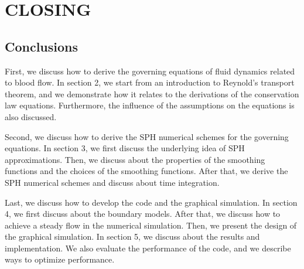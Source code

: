 \chapter{CLOSING}
\thispagestyle{fancy}

	\section{Conclusions}
	    \iffalse
	    First, we discuss how to derive the governing equations of fluid dynamics related to blood flow. In section 2, we start from an introduction to Reynold's transport theorem, and we demonstrate how it relates to the derivations of the conservation law equations. Furthermore, the influence of the assumptions on the equations is also discussed.
	    \par
	    Second, we discuss how to derive the SPH numerical schemes for the governing equations. In section 3, we first discuss the underlying idea of SPH approximations. Then, we discuss about the properties of the smoothing functions and the choices of the smoothing functions. After that, we derive the SPH numerical schemes and discuss about time integration.
	    \par
	    Last, we discuss how to develop the code and the graphical simulation. In section 4, we first discuss about the boundary models. After that, we discuss how to achieve a steady flow in the numerical simulation. Then, we present the design of the graphical simulation. In section 5, we discuss about the results and implementation. We also evaluate the performance of the code, and we describe ways to optimize performance.
	    
